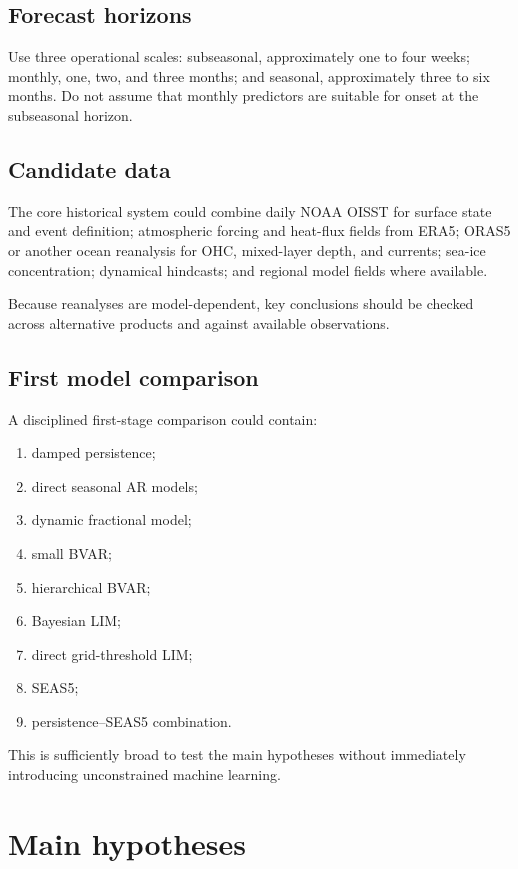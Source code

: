 \documentclass[11pt]{article}
\begin{document}
\subsection{Forecast horizons}

Use three operational scales: subseasonal, approximately one to four weeks; monthly, one, two, and three months; and seasonal, approximately three to six months. Do not assume that monthly predictors are suitable for onset at the subseasonal horizon.

\subsection{Candidate data}

The core historical system could combine daily NOAA OISST for surface state and event definition; atmospheric forcing and heat-flux fields from ERA5; ORAS5 or another ocean reanalysis for OHC, mixed-layer depth, and currents; sea-ice concentration; dynamical hindcasts; and regional model fields where available.

Because reanalyses are model-dependent, key conclusions should be checked across alternative products and against available observations.

\subsection{First model comparison}

A disciplined first-stage comparison could contain:

\begin{enumerate}
  \item damped persistence;
  \item direct seasonal AR models;
  \item dynamic fractional model;
  \item small BVAR;
  \item hierarchical BVAR;
  \item Bayesian LIM;
  \item direct grid-threshold LIM;
  \item SEAS5;
  \item persistence--SEAS5 combination.
\end{enumerate}

This is sufficiently broad to test the main hypotheses without immediately introducing unconstrained machine learning.

\section{Main hypotheses}
\end{document}
